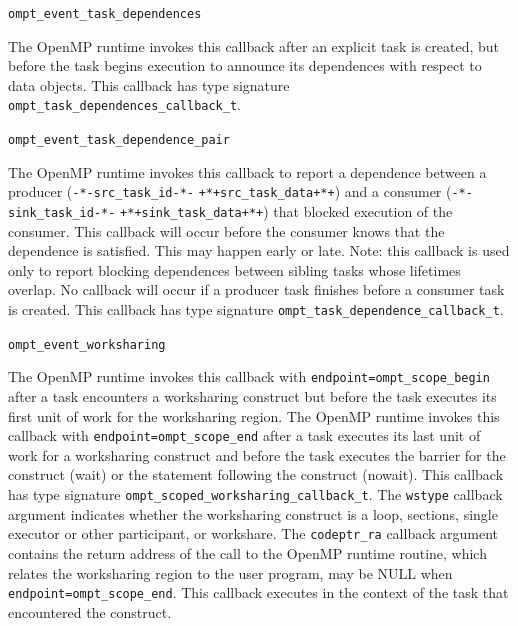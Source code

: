 \documentclass{article}
\newcommand{\descheader}[1]{{\needspace{3\baselineskip}\vspace{1em}\noindent \fbox{#1}}}
\providecommand{\DIFaddbegin}{} %
\providecommand{\DIFaddend}{} %
\providecommand{\DIFdelbegin}{} %
\providecommand{\DIFdelend}{} %
\begin{document}
\begin{description}
\sloppy


\item \lstinline|ompt_event_task_dependences|

  The OpenMP runtime invokes this callback after an explicit task is created, 
  but before the task begins execution to announce its dependences with respect to data objects. 
  This callback has type signature \lstinline|ompt_task_dependences_callback_t|.

\item \lstinline|ompt_event_task_dependence_pair|

The OpenMP runtime invokes this callback to report a dependence between a producer (\DIFdelbegin \lstinline|-*-src_task_id-*-|%
\DIFdelend \DIFaddbegin\lstinline|+*+src_task_data+*+|\DIFaddend ) 
and a consumer (\DIFdelbegin \lstinline|-*-sink_task_id-*-|%
\DIFdelend \DIFaddbegin\lstinline|+*+sink_task_data+*+|\DIFaddend ) that blocked execution of the consumer.
This callback will occur before the consumer knows that the dependence is satisfied. This may happen early or late.
Note: this callback is used only to report blocking dependences between sibling tasks whose lifetimes overlap. 
No callback will occur if a producer task finishes before a consumer task is created.
This callback has type signature \lstinline|ompt_task_dependence_callback_t|. 
\end{description}


\descheader{Worksharing}

\begin{description}

\item \lstinline|ompt_event_worksharing|

\sloppy
The OpenMP runtime invokes this callback with \lstinline|endpoint=ompt_scope_begin| after a task encounters a worksharing 
construct but before the task executes its first unit of work for the worksharing region. 
The OpenMP runtime invokes this callback with \lstinline|endpoint=ompt_scope_end| after a task executes 
its last unit of work for a worksharing construct and before the task executes the barrier  for the construct (wait) or the statement following the construct (nowait).
This callback has type signature \lstinline|ompt_scoped_worksharing_callback_t|.
The \lstinline|wstype| callback argument indicates whether the worksharing construct is a loop, sections, single executor or other participant, 
or workshare.
The \lstinline|codeptr_ra| callback argument contains the return address of the call to the OpenMP runtime routine, which relates the worksharing region to the user program,
may be NULL when \lstinline|endpoint=|\lstinline|ompt_scope_end|.
This callback executes in the context of the task that encountered the construct. 

\end{description}
\end{document}
